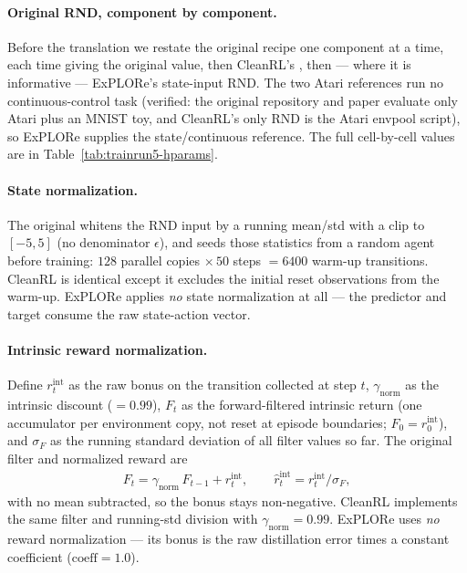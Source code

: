 \paragraph{Original RND, component by component.}
Before the translation we restate the original recipe one component at a time, each time giving the
original \citep{burda2019exploration} value, then CleanRL's \citep{huang2022cleanrl}, then --- where
it is informative --- ExPLORe's \citep{li2023accelerating} state-input RND. The two Atari references
run no continuous-control task (verified: the original repository and paper evaluate only Atari plus
an MNIST toy, and CleanRL's only RND is the Atari envpool script), so ExPLORe supplies the
state/continuous reference. The full cell-by-cell values are in Table~\ref{tab:trainrun5-hparams}.

\paragraph{State normalization.}
The original whitens the RND input by a running mean/std with a clip to $[-5,5]$ (no denominator
$\epsilon$), and seeds those statistics from a random agent before training: $128$ parallel copies
$\times\,50$ steps $=6400$ warm-up transitions. CleanRL is identical except it excludes the initial
reset observations from the warm-up. ExPLORe applies \emph{no} state normalization at all --- the
predictor and target consume the raw state-action vector.

\paragraph{Intrinsic reward normalization.}
Define $r^{\mathrm{int}}_t$ as the raw bonus on the transition collected at step $t$,
$\gamma_{\mathrm{norm}}$ as the intrinsic discount ($=0.99$), $F_t$ as the forward-filtered
intrinsic return (one accumulator per environment copy, not reset at episode boundaries;
$F_0=r^{\mathrm{int}}_0$),
and $\sigma_F$ as the running standard deviation of all filter values so far. The original filter
and normalized reward are
\begin{align}
F_t = \gamma_{\mathrm{norm}}\,F_{t-1} + r^{\mathrm{int}}_t,
\qquad
\hat{r}^{\mathrm{int}}_t = r^{\mathrm{int}}_t / \sigma_F ,
\end{align}
with no mean subtracted, so the bonus stays non-negative. CleanRL implements the same filter and
running-std division with $\gamma_{\mathrm{norm}}{=}0.99$. ExPLORe uses \emph{no} reward
normalization --- its bonus is the raw distillation error times a constant coefficient
($\mathrm{coeff}{=}1.0$).

